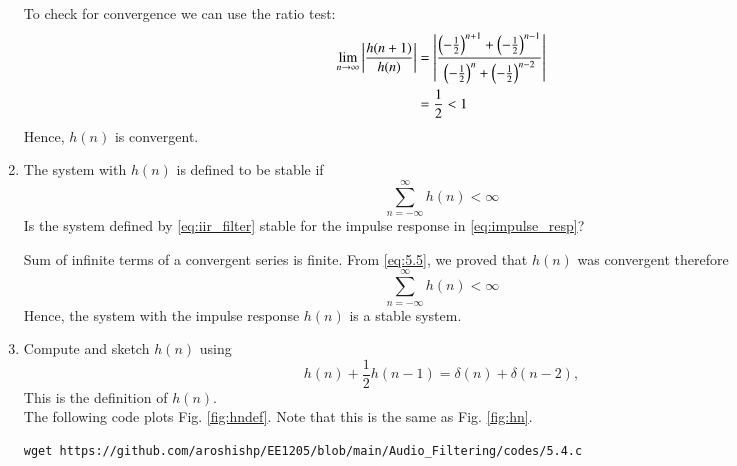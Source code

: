 \documentclass[journal,12pt,twocolumn]{IEEEtran}
\theoremstyle{remark}
\renewcommand\thesection{\arabic{section}}
\numberwithin{equation}{subsection}
\begin{document}
\begin{enumerate}[label=\thesection.\arabic*]
To check for convergence we can use the ratio test:
\begin{align}
    \lim_{n \to \infty}\left\vert\frac{h(n + 1)}{h(n)}\right\vert &= \left\vert\frac{\left(-\frac{1}{2}\right)^{n+1} + \left(-\frac{1}{2}\right)^{n-1}}{\left(-\frac{1}{2}\right)^{n} + \left(-\frac{1}{2}\right)^{n-2}}\right\vert\\
    &= \frac{1}{2} < 1 \label{eq:5.5}
\end{align}
Hence, $h(n)$ is convergent.

\item The system with $h(n)$ is defined to be stable if
\begin{equation}
\sum_{n=-\infty}^{\infty}h(n) < \infty \label{eq:5.6}
\end{equation}
Is the system defined by \eqref{eq:iir_filter} stable for the impulse response in \eqref{eq:impulse_resp}?

\solution Sum of infinite terms of a convergent series is finite. From \eqref{eq:5.5}, we proved that $h(n)$ was convergent therefore
\begin{equation}
\sum_{n=-\infty}^{\infty}h(n) < \infty
\end{equation}
Hence, the system with the impulse response $h(n)$ is a stable system.

\item 
Compute and sketch $h(n)$ using 
\begin{equation}
\label{eq:iir_filter_h}
h(n) + \frac{1}{2}h(n-1) = \delta(n) + \delta(n-2), 
\end{equation}
%
This is the definition of $h(n)$.
\\
\solution The following code plots Fig. \ref{fig:hndef}. Note that this is the same as Fig. 
\ref{fig:hn}. 
%
\begin{lstlisting}
wget https://github.com/aroshishp/EE1205/blob/main/Audio_Filtering/codes/5.4.c


\end{lstlisting}
\end{enumerate}
\end{document}
